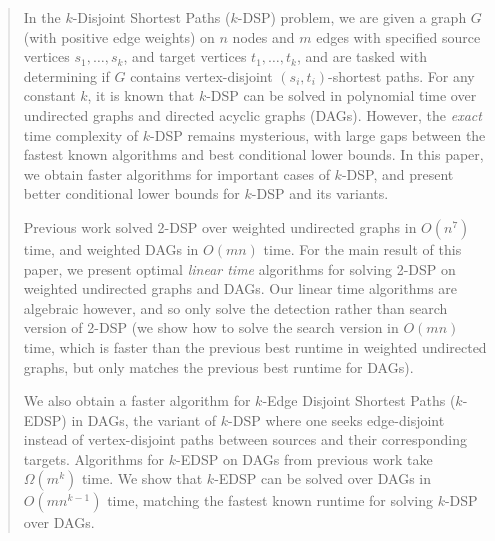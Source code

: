 \documentclass[11pt]{article}
\theoremstyle{definition}
\begin{document}
\vspace{-4ex}
\begin{abstract}
    In the \textsf{$k$-Disjoint Shortest Paths ($k$-DSP)} problem, we are given a graph $G$ (with positive edge weights) on $n$ nodes and $m$ edges with specified source vertices $s_1, \dots, s_k$, and target vertices $t_1, \dots, t_k$, and are tasked with determining if $G$ contains vertex-disjoint $(s_i,t_i)$-shortest paths.
    For any constant $k$, it is known that \textsf{$k$-DSP} can be solved in polynomial time over undirected graphs and directed acyclic graphs (DAGs).
     However, the \textit{exact} time complexity of \textsf{$k$-DSP} remains mysterious,
    with large gaps between the fastest known algorithms and best conditional lower bounds.
    In this paper, we obtain faster algorithms for important cases of \textsf{$k$-DSP}, and present better conditional lower bounds for \textsf{$k$-DSP} and its variants.
    
    Previous work solved \textsf{2-DSP} over weighted undirected graphs in $O(n^7)$ time, 
    and weighted DAGs in $O(mn)$ time. 
    For the main result of this paper, we present optimal \emph{linear time}  algorithms for solving \textsf{2-DSP} on weighted undirected graphs and DAGs.
    Our linear time algorithms are algebraic however, and so only solve the detection rather than search version of \textsf{2-DSP} (we show how to solve the search version in $O(mn)$ time, which is  faster than the previous best runtime in weighted undirected graphs, but only matches the previous best runtime for DAGs).

    We also obtain a faster algorithm for \textsf{$k$-Edge Disjoint Shortest Paths ($k$-EDSP)} in DAGs, the variant of \textsf{$k$-DSP} where one seeks edge-disjoint instead of vertex-disjoint paths between sources and their corresponding targets.
    Algorithms for \textsf{$k$-EDSP} on DAGs from previous work take  $\Omega(m^k)$ time.
    We show that \textsf{$k$-EDSP} can be solved over DAGs in $O(mn^{k-1})$ time, matching the fastest known runtime for solving \textsf{$k$-DSP} over DAGs.


\end{abstract}
\end{document}
